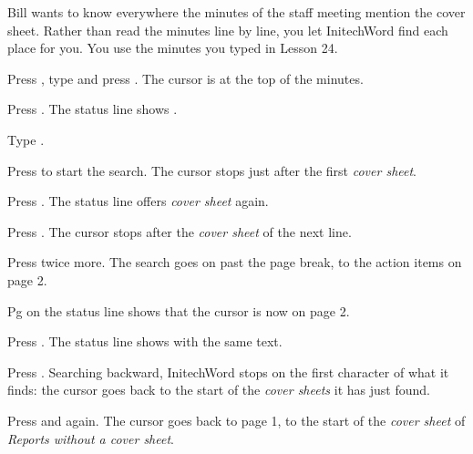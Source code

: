 Bill wants to know everywhere the minutes of the staff meeting mention the
cover sheet.  Rather than read the minutes line by line, you let
InitechWord find each place for you.  You use the minutes you typed in
Lesson 24.

\begin{WPSteps}
\item Press , type  and press
.  The cursor is at the top of the minutes.
\item Press .  The status line shows
.
\item Type .
\end{WPSteps}
\begin{WPSteps}[resume]
\item Press  to start the search.  The cursor stops just after
the first \textit{cover sheet}.
\end{WPSteps}

\begin{WPSteps}
\item Press .  The status line offers
\textit{cover sheet} again.
\item Press .  The cursor stops after the \textit{cover sheet} of
the next line.
\item Press  twice more.  The search goes on past the
page break, to the action items on page 2.
\end{WPSteps}
\begin{Aside}Pg on the status line shows that the cursor is now on page
2.\end{Aside}

\begin{WPSteps}
\item Press .  The status line shows
 with the same text.
\item Press .  Searching backward, InitechWord stops on the
first character of what it finds: the cursor goes back to the start of the
\textit{cover sheets} it has just found.
\item Press  and  again.  The
cursor goes back to page 1, to the start of the \textit{cover sheet} of
\textit{Reports without a cover sheet}.
\end{WPSteps}

